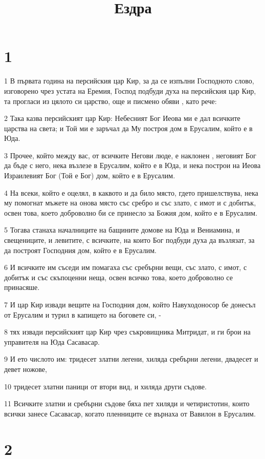

\title{Ездра}


\chapter{1}

\par 1 В първата година на персийския цар Кир, за да се изпълни Господното слово, изговорено чрез устата на Еремия, Господ подбуди духа на персийския цар Кир, та прогласи из цялото си царство, още и писмено обяви , като рече:
\par 2 Така казва персийският цар Кир: Небесният Бог Иеова ми е дал всичките царства на света; и Той ми е заръчал да Му построя дом в Ерусалим, който е в Юда.
\par 3 Прочее, който между вас, от всичките Негови люде, е наклонен , неговият Бог да бъде с него, нека възлезе в Ерусалим, който е в Юда, и нека построи на Иеова Израилевият Бог (Той е Бог) дом, който е в Ерусалим.
\par 4 На всеки, който е оцелял, в каквото и да било място, гдето пришелствува, нека му помогнат мъжете на онова място със сребро и със злато, с имот и с добитък, освен това, което доброволно би се принесло за Божия дом, който е в Ерусалим.
\par 5 Тогава станаха началниците на бащините домове на Юда и Вениамина, и свещениците, и левитите, с всичките, на които Бог подбуди духа да възлязат, за да построят Господния дом, който е в Ерусалим.
\par 6 И всичките им съседи им помагаха със сребърни вещи, със злато, с имот, с добитък и със скъпоценни неща, освен всичко това, което доброволно се принасяше.
\par 7 И цар Кир извади вещите на Господния дом, който Навуходоносор бе донесъл от Ерусалим и турил в капището на боговете си, -
\par 8 тях извади персийският цар Кир чрез съкровищника Митридат, и ги брои на управителя на Юда Сасавасар.
\par 9 И ето числото им: тридесет златни легени, хиляда сребърни легени, двадесет и девет ножове,
\par 10 тридесет златни паници от втори вид, и хиляда други съдове.
\par 11 Всичките златни и сребърни съдове бяха пет хиляди и четиристотин, които всички занесе Сасавасар, когато пленниците се върнаха от Вавилон в Ерусалим.

\chapter{2}

